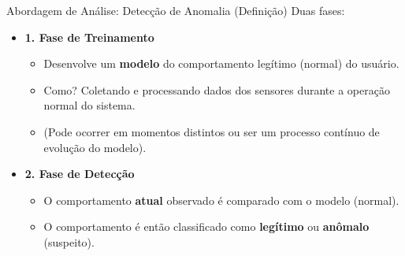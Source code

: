 \begin{frame}{Abordagem de Análise: Detecção de Anomalia (Definição)}
    Duas fases:
    \begin{itemize}

        \item \textbf{1. Fase de Treinamento}
              \begin{itemize}
                  \item Desenvolve um \textbf{modelo} do comportamento legítimo (normal) do usuário.
                  \item Como? Coletando e processando dados dos sensores durante a operação normal do sistema.
                  \item (Pode ocorrer em momentos distintos ou ser um processo contínuo de evolução do modelo).
              \end{itemize}

        \item \textbf{2. Fase de Detecção}
              \begin{itemize}
                  \item O comportamento \textbf{atual} observado é comparado com o modelo (normal).
                  \item O comportamento é então classificado como \textbf{legítimo} ou \textbf{anômalo} (suspeito).
              \end{itemize}
    \end{itemize}
\end{frame}

